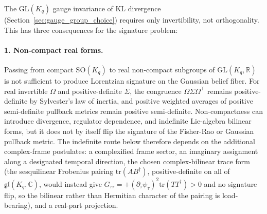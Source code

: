 \documentclass[11pt]{article}
\begin{document}
The $\mathrm{GL}(K_q)$ gauge invariance of KL divergence (Section~\ref{sec:gauge_group_choice}) requires only invertibility, not orthogonality. This has three consequences for the signature problem:

\paragraph{1. Non-compact real forms.} Passing from compact $\mathrm{SO}(K_q)$ to real non-compact subgroups of $\mathrm{GL}(K_q,\mathbb{R})$ is not sufficient to produce Lorentzian signature on the Gaussian belief fiber. For real invertible $\Omega$ and positive-definite $\Sigma$, the congruence $\Omega\Sigma\Omega^\top$ remains positive-definite by Sylvester's law of inertia, and positive weighted averages of positive semi-definite pullback metrics remain positive semi-definite. Non-compactness can introduce divergence, regulator dependence, and indefinite Lie-algebra bilinear forms, but it does not by itself flip the signature of the Fisher-Rao or Gaussian pullback metric. The indefinite route below therefore depends on the additional complex-frame postulates: a complexified frame sector, an imaginary assignment along a designated temporal direction, the chosen complex-bilinear trace form (the sesquilinear Frobenius pairing $\mathrm{tr}(AB^\dagger)$, positive-definite on all of $\mathfrak{gl}(K_q, \mathbb{C})$, would instead give $G_{\tau\tau} = +(\partial_\tau\psi_\tau)^2\mathrm{tr}(TT^\dagger) > 0$ and no signature flip, so the bilinear rather than Hermitian character of the pairing is load-bearing), and a real-part projection.
\end{document}
